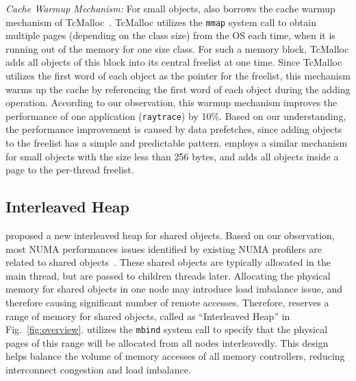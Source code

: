 \textit{Cache Warmup Mechanism:} For small objects, \NM{} also borrows the cache warmup mechanism of TcMalloc~\cite{tcmalloc}. TcMalloc utilizes the \texttt{mmap} system call to obtain multiple pages (depending on the class size) from the OS each time, when it is running out of the memory for one size class. For such a memory block, TcMalloc adds all objects of this block into its central freelist at one time. Since TcMalloc utilizes the first word of each object as the pointer for the freelist, this mechanism warms up the cache by referencing the first word of each object during the adding operation. According to our observation, this warmup mechanism improves the performance of one application (\texttt{raytrace}) by 10\%. Based on our understanding, the performance improvement is caused by data prefetches, since adding objects to the freelist has a simple and predictable pattern. \NM{} employs a similar mechanism for small objects with the size less than 256 bytes, and adds all objects inside a page to the per-thread freelist. 

\subsection{Interleaved Heap} 
\label{sec:mainthread}

\NA{} proposed a new interleaved heap for shared objects. Based on our observation, most NUMA performances issues identified by existing NUMA profilers are related to shared objects~\cite{XULIU, MemProf}. These shared objects are typically allocated in the main thread, but are  passed to children threads later. Allocating the physical memory for shared objects in one node may introduce load imbalance issue, and therefore causing significant number of remote accesses. Therefore, \NA{} reserves a range of memory for shared objects, called as ``Interleaved Heap'' in Fig.~\ref{fig:overview}. \NA{} utilizes the \texttt{mbind} system call to specify that the physical pages of this range will be allocated from all nodes interleavedly. This design helps balance the volume of memory accesses of all memory controllers, reducing interconnect congestion and load imbalance. 

